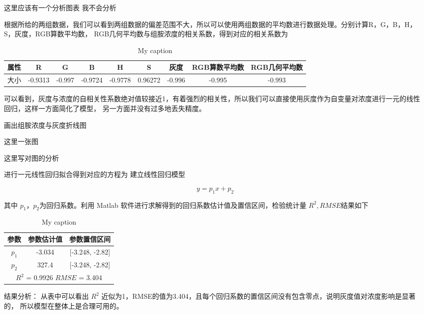     这里应该有一个分析图表 我不会分析

    根据所给的两组数据，我们可以看到两组数据的偏差范围不大，所以可以使用两组数据的平均数进行数据处理。分别计算R，G，B，H，S，灰度，RGB算数平均数，
    RGB几何平均数与组胺浓度的相关系数，得到对应的相关系数为
    \begin{table}[H]
        \centering
        \caption{My caption}
        \label{my-label}
        \begin{tabular}{@{}ccccccccc@{}}
        \toprule
        属性 & R       & G      & B       & H       & S       & 灰度     & RGB算数平均数 & RGB几何平均数 \\ \midrule
        大小 & -0.9313 & -0.997 & -0.9724 & -0.9778 & 0.96272 & -0.996 & -0.995   & -0.993   \\ \bottomrule
        \end{tabular}
        \end{table}
         
    可以看到，灰度与浓度的自相关性系数绝对值较接近1，有着强烈的相关性，所以我们可以直接使用灰度作为自变量对浓度进行一元的线性回归，这样一方面简化了模型，
    另一方面并没有过多地丢失精度。

    画出组胺浓度与灰度折线图

    这里一张图

    这里写对图的分析

    进行一元线性回归拟合得到对应的方程为
    建立线性回归模型

    $$ y = p_1 x + p_2$$

    其中 $p_{1}，p_{2}$为回归系数。利用 Matlab 软件进行求解得到的回归系数估计值及置信区间，检验统计量 $R^2, RMSE $结果如下

    \begin{table}[H]
        \centering
        \caption{My caption}
        \label{my-label}
        \begin{tabular}{@{}ccc@{}}
        \toprule
        参数         & 参数估计值      & 参数置信区间                  \\ \midrule
        $p_1$      & -3.034     & {[}-3.248, -2.82{]}     \\
        $p_2$      & 327.4      & {[}-3.248, -2.82{]}     \\
        \hline
        \multicolumn{3}{c}{$R^2$ = 0.9926 $RMSE$ = 3.404} \\ \bottomrule
        \end{tabular}
        \end{table}

    结果分析： 从表中可以看出 $R^2$ 近似为1，RMSE的值为3.404，且每个回归系数的置信区间没有包含零点，说明灰度值对浓度影响是显著的，
    所以模型在整体上是合理可用的。


